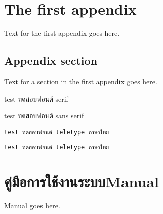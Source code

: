 \chapter{The first appendix}

Text for the first appendix goes here.

\section{Appendix section}

Text for a section in the first appendix goes here.

test ทดสอบฟอนต์ serif

\textsf{test ทดสอบฟอนต์ sans serif}

\texttt{test ทดสอบฟอนต์ teletype ภาษาไทย}

\verb+test ทดสอบฟอนต์ teletype ภาษาไทย+

\chapter{\ifcpe คู่มือการใช้งานระบบ\else Manual\fi}

Manual goes here.
